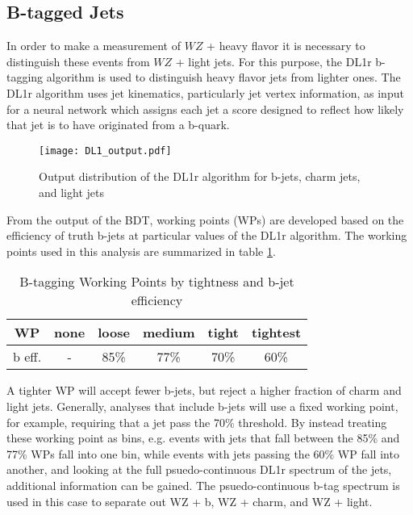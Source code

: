 \subsection{B-tagged Jets}
\label{subsec:bjets}

In order to make a measurement of $WZ$ + heavy flavor it is necessary to distinguish these events from $WZ$ + light jets. For this purpose, the DL1r b-tagging algorithm is used to distinguish heavy flavor jets from lighter ones. The DL1r algorithm uses jet kinematics, particularly jet vertex information, as input for a neural network which assigns each jet a score designed to reflect how likely that jet is to have originated from a b-quark. 

\begin{figure}[h]
    \centering
    \texttt{[image: DL1\_output.pdf]} 
    \caption{Output distribution of the DL1r algorithm for b-jets, charm jets, and light jets}
    \label{fig:DL1r}
\end{figure}

From the output of the BDT, working points (WPs) are developed based on the efficiency of truth b-jets at particular values of the DL1r algorithm. The working points used in this analysis are summarized in table \ref{tab:btag_WPs}. 

\begin{table}[h]
\begin{center}
\begin{tabular}{|c|ccccc|}
    \hline
       WP &  none & loose & medium & tight & tightest\\
       \hline
     b eff. & - & 85\% & 77\% & 70\% & 60\% \\ 
    \hline
    \end{tabular}    
    \caption{B-tagging Working Points by tightness and b-jet efficiency}
    \label{tab:btag_WPs}
    \end{center}
\end{table}

A tighter WP will accept fewer b-jets, but reject a higher fraction of charm and light jets. Generally, analyses that include b-jets will use a fixed working point, for example, requiring that a jet pass the 70\% threshold. By instead treating these working point as bins, e.g. events with jets that fall between the 85\% and 77\% WPs fall into one bin, while events with jets passing the 60\% WP fall into another, and looking at the full psuedo-continuous DL1r spectrum of the jets, additional information can be gained. The psuedo-continuous b-tag spectrum is used in this case to separate out WZ + b, WZ + charm, and WZ + light. 

